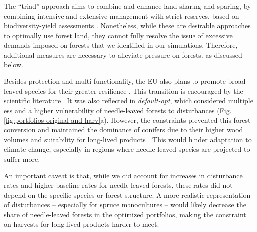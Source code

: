 \documentclass[]{article}
\begin{document}
The ``triad'' approach aims to combine and enhance land sharing and sparing, by combining intensive and extensive management with strict reserves, based on biodiversity-yield assessments \parencite{Betts2021}.
Nonetheless, while these are desirable approaches to optimally use forest land, they cannot fully resolve the issue of excessive demands imposed on forests that we identified in our simulations. 
Therefore, additional measures are necessary to alleviate pressure on forests, as discussed below.






Besides protection and multi-functionality, the EU also plans to promote broad-leaved species for their greater resilience \parencite{EUForestStrategy2030}. This transition is encouraged by the scientific literature \parencite{Schwaab2020, Astrup2018, Felton2010, SCHELHAAS2010, HLASNY2021, PARDOS2021}. It was also reflected in \textit{default-opt}, which considered multiple \glspl{es} and a higher vulnerability of needle-leaved forests to disturbances (Fig. \ref{fig:portfolios-original-and-harv}a).
However, the constraints prevented this forest conversion and maintained the dominance of conifers due to their higher wood volumes and suitability for long-lived products \parencite{Eurostat2020}. This would hinder adaptation to climate change, especially in regions where needle-leaved species are projected to suffer more.

An important caveat is that, while we did account for increases in disturbance rates and higher baseline rates for needle-leaved forests, these rates did not depend on the specific species or forest structure. A more realistic representation of disturbances -- especially for spruce monocultures -- would likely decrease the share of needle-leaved forests in the optimized portfolios, making the constraint on harvests for long-lived products harder to meet.
\end{document}
